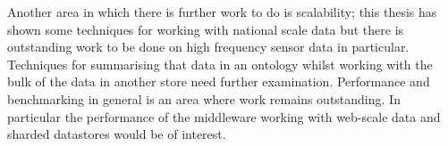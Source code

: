 Another area in which there is further work to do is scalability; this thesis has shown some techniques for working with national scale data but there is outstanding work to be done on high frequency sensor data in particular. Techniques for summarising that data in an ontology whilst working with the bulk of the data in another store need further examination. Performance and benchmarking in general is an area where work remains outstanding. In particular the performance of the middleware working with web-scale data and sharded datastores would be of interest.





